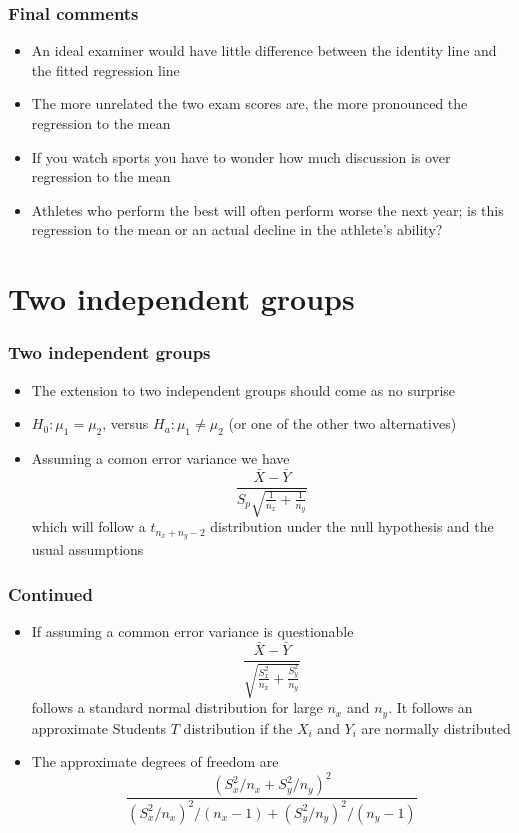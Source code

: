 \documentclass[aspectratio=169]{beamer}
\begin{document}
\begin{frame}\frametitle{Final comments}
  \begin{itemize}
     \item An ideal examiner would have little difference between the identity line
       and the fitted regression line
     \item The more unrelated the two exam scores are, the more pronounced the regression to the mean
     \item If you watch sports you have to wonder how much discussion
       is over regression to the mean
     \item Athletes who perform the best will often perform worse the
       next year; is this regression to the mean or an actual decline
       in the athlete's ability?
  \end{itemize}
  
\end{frame}

\section{Two independent groups}
\begin{frame}\frametitle{Two independent groups}
\begin{itemize}
\item The extension to two independent groups should come as no surprise
\item $H_0:\mu_1 = \mu_2$, versus $H_a:\mu_1 \neq \mu_2$ (or one of the other
  two alternatives)
\item Assuming a comon error variance we have
  $$
  \frac{\bar X - \bar Y}{S_p \sqrt{\frac{1}{n_x} +
      \frac{1}{n_y}}}
  $$
  which will follow a $t_{n_x + n_y - 2}$ distribution under the null
  hypothesis and the usual assumptions
\end{itemize}
\end{frame}

\begin{frame}\frametitle{Continued}
\begin{itemize}
\item If assuming a common error variance is questionable
$$
  \frac{\bar X - \bar Y}{\sqrt{\frac{S_x^2}{n_x} + \frac{S_y^2}{n_y}}}
  $$
  follows a standard normal distribution for large $n_x$ and $n_y$.
  It follows an approximate Students $T$ distribution if the $X_i$ and
  $Y_i$ are normally distributed 
\item The approximate degrees of freedom are
  $$
  \frac{(S_x^2 / n_x + S_y^2 / n_y)^2}{(S_x^2 / n_x)^2 / (n_x - 1) + (S_y^2 / n_y)^2 / (n_y - 1)}
  $$
\end{itemize}
\end{frame}
\end{document}
